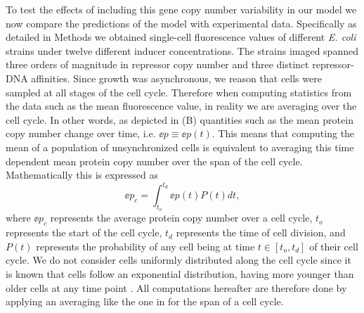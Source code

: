 To test the effects of including this gene copy number variability in our model
we now compare the predictions of the model with experimental data. Specifically
as detailed in Methods we obtained single-cell fluorescence values of
different {\it E. coli} strains under twelve different inducer concentrations.
The strains imaged spanned three orders of magnitude in repressor copy number
and three distinct repressor-DNA affinities. Since growth was asynchronous, we
reason that cells were sampled at all stages of the cell cycle. Therefore when
computing statistics from the data such as the mean fluorescence value, in
reality we are averaging over the cell cycle. In other words, as depicted in
(B) quantities such as the mean protein copy number change
over time, i.e. $\ee{p} \equiv \ee{p(t)}$. This means that computing the mean of
a population of unsynchronized cells is equivalent to averaging this time
dependent mean protein copy number over the span of the cell cycle.
Mathematically this is expressed as
\begin{equation}
	\ee{p}_c = \int_{t_o}^{t_d} \ee{p(t)} P(t) dt,
	\label{eq_time_avg}
\end{equation}
where $\ee{p}_c$ represents the average protein copy number over a cell cycle,
$t_o$ represents the start of the cell cycle, $t_d$ represents the time of cell
division, and $P(t)$ represents the probability of any cell being at time $t \in
[t_o, t_d]$ of their cell cycle. We do not consider cells uniformly distributed
along the cell cycle since it is known that cells follow an exponential
distribution, having more younger than older cells at any time point
\cite{Powell1956}. All computations hereafter are therefore done by applying an
averaging like the one in  for the span of a cell cycle.

